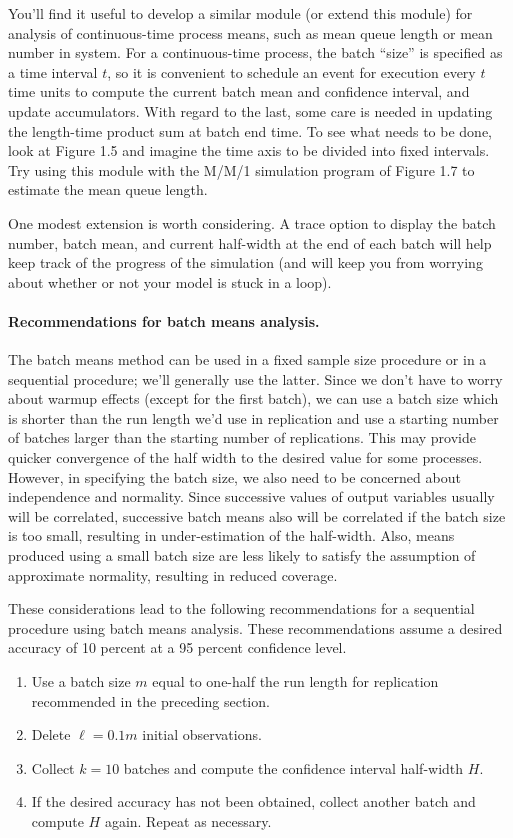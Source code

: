 You'll find it useful to develop a similar module (or extend this module)
for analysis of continuous-time process means, such as mean queue length or
mean number in system. For a continuous-time process, the batch ``size'' is
specified as a time interval $t$, so it is convenient to schedule an event for
execution every $t$ time units to compute the current batch mean and confidence
interval, and update accumulators. With regard to the last, some care is
needed in updating the length-time product sum at batch end time. To see what
needs to be done, look at Figure 1.5 and imagine the time axis to be divided
into fixed intervals. Try using this module with the M/M/1 simulation program
of Figure 1.7 to estimate the mean queue length.

One modest extension is worth considering. A trace option to display the
batch number, batch mean, and current half-width at the end of each batch
will help keep track of the progress of the simulation (and will keep you
from worrying about whether or not your model is stuck in a loop).

\paragraph{Recommendations for batch means analysis.}
The batch means method can be used in a fixed sample size procedure or in a
sequential procedure; we'll generally use the latter. Since we don't have to
worry about warmup effects (except for the first batch), we can use a batch
size which is shorter than the run length we'd use in replication and use a
starting number of batches larger than the starting number of replications.
This may provide quicker convergence of the half width to the desired value
for some processes. However, in specifying the batch size, we also need to be
concerned about independence and normality. Since successive values of output
variables usually will be correlated, successive batch means also will be
correlated if the batch size is too small, resulting in under-estimation of the
half-width. Also, means produced using a small batch size are less likely to
satisfy the assumption of approximate normality, resulting in reduced
coverage.

These considerations lead to the following recommendations for a sequential
procedure using batch means analysis. These recommendations assume a desired
accuracy of 10 percent at a 95 percent confidence level.

\begin{enumerate}
\item Use a batch size $m$ equal to one-half the run length for replication
  recommended in the preceding section.
\item Delete $\ell = 0.1m$ initial observations.
\item Collect $k = 10$ batches and compute the confidence interval half-width
  $H$.
\item If the desired accuracy has not been obtained, collect another batch and
  compute $H$ again. Repeat as necessary.
\end{enumerate}

